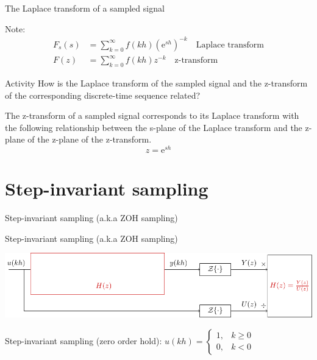 \documentclass[presentation,aspectratio=169]{beamer}
\begin{document}
\begin{frame}[label={sec:org98a8c9b}]{The Laplace transform of a sampled signal}
\small

Note:
\begin{align*}
F_s(s) &=  \sum_{k=0}^{\infty} f(kh) \left(\mathrm{e}^{sh}\right)^{-k}\quad \text{Laplace transform}\\
F(z) &= \sum_{k=0}^{\infty} f(kh) z^{-k} \quad \text{z-transform}
\end{align*}

\alert{Activity} How is the Laplace transform of the sampled signal and the z-transform of the corresponding discrete-time sequence related?

\pause

\begin{tcolorbox}
 The z-transform of a sampled signal corresponds to its Laplace transform with the following relationship between the s-plane of the Laplace transform and the z-plane of the z-plane of the z-transform.
\[ z = \mathrm{e}^{sh}\]
\end{tcolorbox}
\end{frame}


\section{Step-invariant sampling}
\label{sec:orgf99133a}


\begin{frame}[label={sec:orgf0c7c68}]{Step-invariant sampling (a.k.a ZOH sampling)}
\end{frame}

\begin{frame}[label={sec:org06927ae}]{Step-invariant sampling (a.k.a ZOH sampling)}
\begin{center}
\includegraphics[width=0.9\linewidth]{../../figures/invariant-sampling-white.pdf}
\end{center}

\pause
Step-invariant sampling (zero order hold): \(u(kh) = \begin{cases} 1, & k \ge 0\\0, & k<0 \end{cases}\)
\end{frame}
\end{document}
